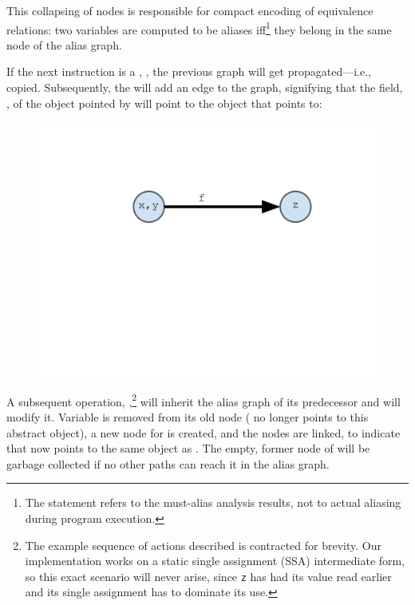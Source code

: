 This collapsing of nodes is responsible for compact encoding of
equivalence relations: two variables are computed to be aliases
iff\footnote{The statement refers to the must-alias analysis results,
  not to actual aliasing during program execution.} they belong in the
same node of the alias graph.

If the next instruction is a , , the
previous graph will get propagated---i.e., copied. Subsequently, the 
will add an edge to the graph, signifying that the field, , of
the object pointed by  will point to the object that 
points to:

\begin{figure}[h]
  \begin{minipage}[b]{\linewidth}
    \centering
    \includegraphics[trim={35mm 115mm 35mm 51mm},clip,width=0.8\linewidth]{assets/must-data/alias-graph2.pdf}
  \end{minipage}
\end{figure}

A subsequent  operation, ,\footnote{The
  example sequence of actions described is contracted for brevity. Our
  implementation works on a static single assignment (SSA)
  intermediate form, so this exact scenario will never arise, since
  \texttt{z} has had its value read earlier and its single assignment
  has to dominate its use.}  will inherit the alias graph of its
predecessor and will modify it.  Variable  is removed from its
old node ( no longer points to this abstract object), a new node
for  is created, and the nodes are linked, to indicate that
 now points to the same object as . The empty, former
node of  will be garbage collected if no other paths can reach
it in the alias graph.

